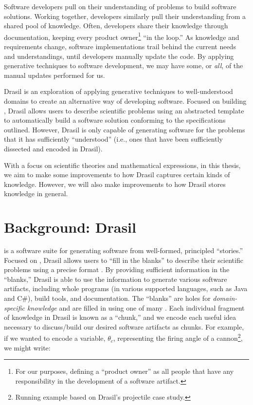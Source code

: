 Software developers pull on their understanding of problems to build software
solutions. Working together, developers similarly pull their understanding from
a shared pool of knowledge. Often, developers share their knowledge through
documentation, keeping every product owner\footnote{For our purposes, defining a
      ``product owner'' as all people that have any responsibility in the development
      of a software artifact.} ``in the loop.'' As knowledge and requirements change,
software implementations trail behind the current needs and understandings,
until developers manually update the code. By applying generative techniques to
software development, we may have some, or \textit{all}, of the manual updates
performed for us.

Drasil \cite{Drasil2021} is an exploration of applying generative techniques to
well-understood domains to create an alternative way of developing software.
Focused on building , Drasil allows users to describe scientific
problems using an abstracted  template to automatically build a
software solution conforming to the specifications outlined. However, Drasil is
only capable of generating software for the problems that it has sufficiently
``understood'' (i.e., ones that have been sufficiently dissected and encoded in
Drasil).

With a focus on scientific theories and mathematical expressions, in this
thesis, we aim to make some improvements to how Drasil captures certain kinds of
knowledge. However, we will also make improvements to how Drasil stores
knowledge in general.

\section{Background: Drasil}
\label{chap:introduction:sec:background}

 is a software suite
for generating software from well-formed, principled ``stories.'' Focused on
, Drasil allows users to ``fill in the blanks'' to describe their
scientific problems using a precise  format \cite{SmithAndLai2005}. By
providing sufficient information in the ``blanks,'' Drasil is able to use the
information to generate various software artifacts, including whole programs (in
various supported languages, such as Java and C\#), build tools, and
documentation. The ``blanks'' are holes for \textit{domain-specific knowledge}
and are filled in using one of many . Each individual fragment of
knowledge in Drasil is known as a ``chunk,'' and we encode each useful idea
necessary to discuss/build our desired software artifacts as chunks. For
example, if we wanted to encode a variable, \(\theta{}_{c}\), representing the
firing angle of a cannon\footnote{Running example based on Drasil's
\acs{projectile} case study.}, we might write:

